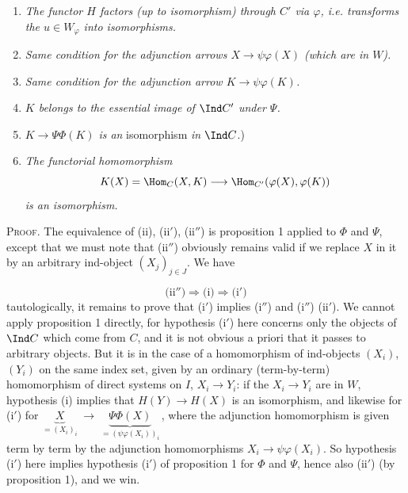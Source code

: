 \begin{enumerate}[label={}]
\item[(i)] \textit{The functor $H$ factors (up to isomorphism) through $C'$ via $\varphi$, i.e. transforms the $u \in W_\varphi$ into isomorphisms.}
\item[(i$'$)] \textit{Same condition for the adjunction arrows $X \longrightarrow \psi\varphi(X)$ (which are in $W$).}
\item[(i$''$)] \textit{Same condition for the adjunction arrow $K \longrightarrow \psi\varphi(K)$.}
\item[(ii)] \textit{$K$ belongs to the essential image of} $\Ind C'$ \textit{under $\Psi$.}
\item[(ii$'$)] $K \longrightarrow \Psi\Phi(K)$ \textit{is an} isomorphism \textit{in} $\Ind C$.) %
\item[(ii$''$)] \textit{The functorial homomorphism}
\[
K(X) = \Hom_C(X,K) \longrightarrow \Hom_{C'}(\varphi(X),\varphi(K))
\]
 \textit{is an isomorphism.}
\end{enumerate}

\textsc{Proof.} The equivalence of (ii), (ii$'$), (ii$''$) is proposition 1 applied to $\Phi$ and $\Psi$, except that we must note that (ii$''$) obviously remains valid if we replace $X$ in it by an arbitrary ind-object $(X_j)_{j\in J}$. We have

\noindent{}%
\[
\text{(ii$''$)} \Longrightarrow \text{(i)} \Longrightarrow \text{(i$'$)}
\]
tautologically, it remains to prove that (i$'$) implies (i$''$) and (i$''$) (ii$'$). We cannot apply proposition 1 directly, for hypothesis (i$'$) here concerns only the objects of $\Ind C$ which come from $C$, and it is not obvious a priori that it passes to arbitrary objects. But it is in the case of a homomorphism of ind-objects $(X_i)$, $(Y_i)$ on the same index set, given by an ordinary (term-by-term) homomorphism of direct systems on $I$, $X_i \longrightarrow Y_i$: if the $X_i \longrightarrow Y_i$ are in $W$, hypothesis (i) implies that $H(Y) \longrightarrow H(X)$ is an isomorphism, and likewise for (i$'$) for $\underbrace{X}_{=(X_i)_i} \;\longrightarrow\; \underbrace{\Psi\Phi(X)}_{=(\psi\varphi(X_i))_i}$\,, where the adjunction homomorphism is given term by term by the adjunction homomorphisms $X_i \longrightarrow \psi\varphi(X_i)$. So hypothesis (i$'$) here implies hypothesis (i$'$) of proposition 1 for $\Phi$ and $\Psi$, hence also (ii$'$) (by proposition 1), and we win. %

